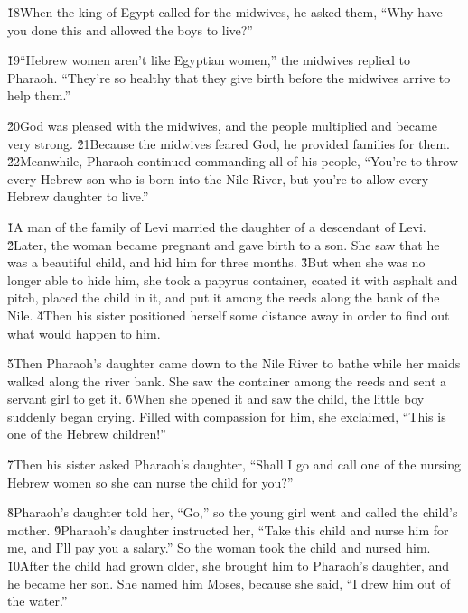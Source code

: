\v{18}When the king of Egypt called for the midwives, he asked them, ``Why have you done this and allowed the boys to live?''

\v{19}``Hebrew women aren't like Egyptian women,'' the midwives replied to Pharaoh. ``They're so healthy that they give birth before the midwives arrive to help them.''

\v{20}God was pleased with the midwives, and the people multiplied and became very strong. \v{21}Because the midwives feared God, he provided families for them. \v{22}Meanwhile, Pharaoh continued commanding all of his people, ``You're to throw every Hebrew son who is born into the Nile River, but you're to allow every Hebrew daughter to live.''

\v{1}A man of the family of Levi married the daughter of a descendant of Levi. \v{2}Later, the woman became pregnant and gave birth to a son. She saw that he was a beautiful child, and hid him for three months. \v{3}But when she was no longer able to hide him, she took a papyrus container, coated it with asphalt and pitch, placed the child in it, and put it among the reeds along the bank of the Nile. \v{4}Then his sister positioned herself some distance away in order to find out what would happen to him.

\v{5}Then Pharaoh's daughter came down to the Nile River to bathe while her maids walked along the river bank. She saw the container among the reeds and sent a servant girl to get it. \v{6}When she opened it and saw the child, the little boy suddenly began crying. Filled with compassion for him, she exclaimed, ``This is one of the Hebrew children!''

\v{7}Then his sister asked Pharaoh's daughter, ``Shall I go and call one of the nursing Hebrew women so she can nurse the child for you?''

\v{8}Pharaoh's daughter told her, ``Go,'' so the young girl went and called the child's mother. \v{9}Pharaoh's daughter instructed her, ``Take this child and nurse him for me, and I'll pay you a salary.'' So the woman took the child and nursed him. \v{10}After the child had grown older, she brought him to Pharaoh's daughter, and he became her son. She named him Moses, because she said, ``I drew him out of the water.''

